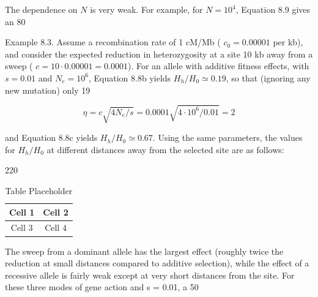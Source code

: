 \documentclass{article}
\begin{document}
The dependence on $N$ is very weak. For example, for $N = 10^4$, Equation 8.9 gives an 80%

Example 8.3. Assume a recombination rate of 1 cM/Mb ( $ c_0 = 0.00001 $ per kb), and consider the expected reduction in heterozygosity at a site 10 kb away from a sweep ( $ c = 10 \cdot 0.00001 = 0.0001 $). For an allele with additive fitness effects, with  $ s = 0.01 $ and  $ N_e = 10^6 $, Equation 8.8b yields  $ H_h / H_0 \simeq 0.19 $, so that (ignoring any new mutation) only 19%

\begin{equation}
\eta=c\sqrt{4N_{e}/s}=0.0001\sqrt{4\cdot10^{6}/0.01}=2
\end{equation}

and Equation 8.8c yields  $ H_h/H_0 \simeq 0.67 $. Using the same parameters, the values for  $ H_h/H_0 $ at different distances away from the selected site are as follows:

220

\begin{table}[h]
\centering
\begin{tabular}{|c|c|}
\hline
Cell 1 & Cell 2 \\
\hline
Cell 3 & Cell 4 \\
\hline
\end{tabular}
\caption{Table Placeholder}
\end{table}

The sweep from a dominant allele has the largest effect (roughly twice the reduction at small distances compared to additive selection), while the effect of a recessive allele is fairly weak except at very short distances from the site. For these three modes of gene action and s = 0.01, a 50%
\end{document}
